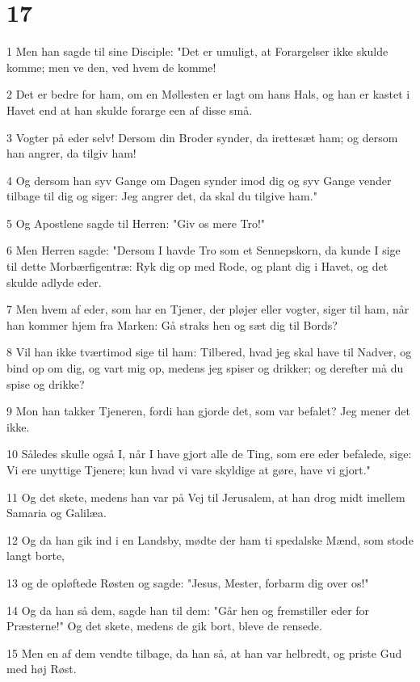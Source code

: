 \chapter{17}

\par 1 Men han sagde til sine Disciple: "Det er umuligt, at Forargelser ikke skulde komme; men ve den, ved hvem de komme!
\par 2 Det er bedre for ham, om en Møllesten er lagt om hans Hals, og han er kastet i Havet end at han skulde forarge een af disse små.
\par 3 Vogter på eder selv! Dersom din Broder synder, da irettesæt ham; og dersom han angrer, da tilgiv ham!
\par 4 Og dersom han syv Gange om Dagen synder imod dig og syv Gange vender tilbage til dig og siger: Jeg angrer det, da skal du tilgive ham."
\par 5 Og Apostlene sagde til Herren: "Giv os mere Tro!"
\par 6 Men Herren sagde: "Dersom I havde Tro som et Sennepskorn, da kunde I sige til dette Morbærfigentræ: Ryk dig op med Rode, og plant dig i Havet, og det skulde adlyde eder.
\par 7 Men hvem af eder, som har en Tjener, der pløjer eller vogter, siger til ham, når han kommer hjem fra Marken: Gå straks hen og sæt dig til Bords?
\par 8 Vil han ikke tværtimod sige til ham: Tilbered, hvad jeg skal have til Nadver, og bind op om dig, og vart mig op, medens jeg spiser og drikker; og derefter må du spise og drikke?
\par 9 Mon han takker Tjeneren, fordi han gjorde det, som var befalet? Jeg mener det ikke.
\par 10 Således skulle også I, når I have gjort alle de Ting, som ere eder befalede, sige: Vi ere unyttige Tjenere; kun hvad vi vare skyldige at gøre, have vi gjort."
\par 11 Og det skete, medens han var på Vej til Jerusalem, at han drog midt imellem Samaria og Galilæa.
\par 12 Og da han gik ind i en Landsby, mødte der ham ti spedalske Mænd, som stode langt borte,
\par 13 og de opløftede Røsten og sagde: "Jesus, Mester, forbarm dig over os!"
\par 14 Og da han så dem, sagde han til dem: "Går hen og fremstiller eder for Præsterne!" Og det skete, medens de gik bort, bleve de rensede.
\par 15 Men en af dem vendte tilbage, da han så, at han var helbredt, og priste Gud med høj Røst.
